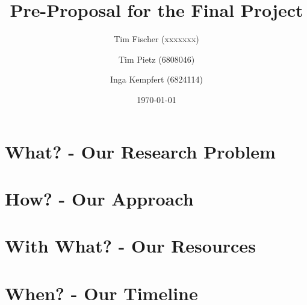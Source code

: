 \documentclass{article}
\title{Pre-Proposal for the Final Project}
\date{\today}
\author{Tim Fischer (xxxxxxx) \and Tim Pietz (6808046) \and Inga Kempfert (6824114)}
\begin{document}
\maketitle

\section{What? - Our Research Problem}

\section{How? -  Our Approach}

\section{With What? - Our Resources}

\section{When? - Our Timeline}
\end{document}
